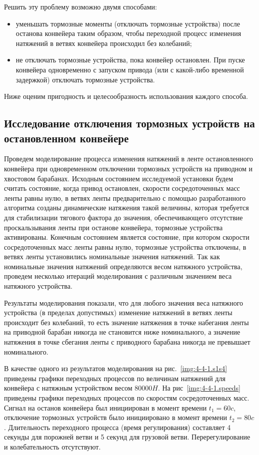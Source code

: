 Решить эту проблему возможно двумя способами:
\begin{itemize}
\item уменьшать тормозные моменты (отключать тормозные устройства) после останова конвейера таким образом, чтобы переходной процесс изменения натяжений в ветвях конвейера происходил без колебаний;
\item не отключать тормозные устройства, пока конвейер остановлен. При пуске конвейера одновременно с запуском привода (или с какой-либо временной задержкой) отключать тормозные устройства.
\end{itemize}

Ниже оценим пригодность и целесообразность использования каждого способа.

\subsection{Исследование отключения тормозных устройств на остановленном конвейере} \label{subsect4_4_1}
Проведем моделирование процесса изменения натяжений в ленте остановленного конвейера при одновременном отключении тормозных устройств на приводном и хвостовом барабанах. Исходным состоянием исследуемой установки будем считать состояние, когда привод остановлен, скорости сосредоточенных масс ленты равны нулю, в ветвях ленты предварительно с помощью разработанного алгоритма созданы динамические натяжения такой величины, которая требуется для стабилизации тягового фактора до значения, обеспечивающего отсутствие проскальзывания ленты при останове конвейера, тормозные устройства активированы. Конечным состоянием является состояние, при котором скорости сосредоточенных масс ленты равны нулю, тормозные устройства отключены, в ветвях ленты установились номинальные значения натяжений. Так как номинальные значения натяжений определяются весом натяжного устройства, проведем несколько итераций моделирования с различным значением веса натяжного устройства.

Результаты моделирования показали, что для любого значения веса натяжного устройства (в пределах допустимых) изменение натяжений в ветвях ленты происходит без колебаний, то есть значение натяжения в точке набегания ленты на приводной барабан никогда не становится ниже номинального, а значение натяжения в точке сбегания ленты с приводного барабана никогда не превышает номинального.

В качестве одного из результатов моделирования на рис.~\ref{img:4-4-1.s1s4} приведены графики переходных процессов по величинам натяжений для конвейера с натяжным устройством весом $ 80000 H $. На рис~\ref{img:4-4-1.speeds} приведены графики переходных процессов по скоростям сосредоточенных масс. Сигнал на останов конвейера был инициирован в момент времени $ t_1 = 60 c $, отключение тормозных устройств было инициировано в момент времени $ t_2 = 80 c $. Длительность переходного процесса (время регулирования) составляет 4 секунды для порожней ветви и 5 секунд для грузовой ветви. Перерегулирование и колебательность отсутствуют.

